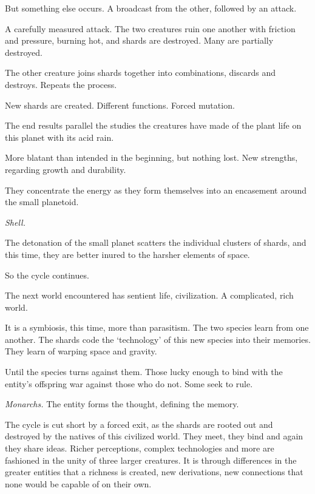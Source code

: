 But something else occurs.  A broadcast from the other, followed by an attack.



A carefully measured attack.  The two creatures ruin one another with friction and pressure, burning hot, and shards are destroyed.  Many are partially destroyed.



The other creature joins shards together into combinations, discards and destroys.  Repeats the process.



New shards are created.  Different functions.  Forced mutation.



The end results parallel the studies the creatures have made of the plant life on this planet with its acid rain.



More blatant than intended in the beginning, but nothing lost.  New strengths, regarding growth and durability.



They concentrate the energy as they form themselves into an encasement around the small planetoid.



\emph{Shell.}



The detonation of the small planet scatters the individual clusters of shards, and this time, they are better inured to the harsher elements of space.



So the cycle continues.



The next world encountered has sentient life, civilization.  A complicated, rich world.



It is a symbiosis, this time, more than parasitism.  The two species learn from one another.  The shards code the `technology' of this new species into their memories.  They learn of warping space and gravity.



Until the species turns against them.  Those lucky enough to bind with the entity's offspring war against those who do not.  Some seek to rule.



\emph{Monarchs.  }The entity forms the thought, defining the memory.



The cycle is cut short by a forced exit, as the shards are rooted out and destroyed by the natives of this civilized world.  They meet, they bind and again they share ideas.  Richer perceptions, complex technologies and more are fashioned in the unity of three larger creatures.  It is through differences in the greater entities that a richness is created, new derivations, new connections that none would be capable of on their own.



